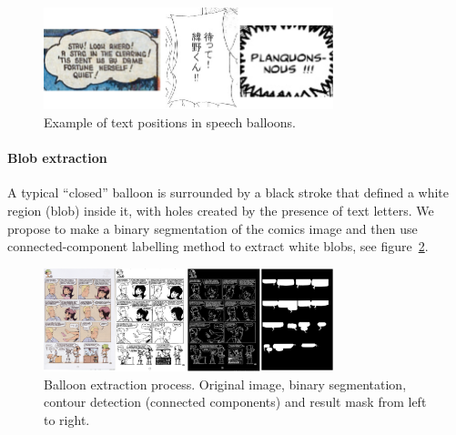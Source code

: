 	\begin{figure}[h!]	%
	  \centering
		\includegraphics[trim= 0px 0px 0px 0px, clip, width=0.75\textwidth]{text_in_balloon.png}
		\caption{Example of text positions in speech balloons.}
		\label{fig:se:se:text_in_balloon}
	\end{figure}

\paragraph{Blob extraction} %
\label{par:blob_extraction}

A typical ``closed'' balloon is surrounded by a black stroke that defined a white region (blob) inside it, with holes created by the presence of text letters.
We propose to make a binary segmentation of the comics image and then use connected-component labelling method to extract white blobs, see figure~\ref{fig:se:se:closed_balloon}.

	\begin{figure}[h!]	%
	  \centering
		\includegraphics[trim= 0px 0px 0px 0px, clip, width=0.75\textwidth]{closed_balloon_process.png}
		\caption{Balloon extraction process. Original image, binary segmentation, contour detection (connected components) and result mask from left to right.}
		\label{fig:se:se:closed_balloon}
	\end{figure}



